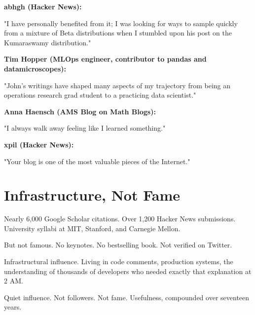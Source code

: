 \textbf{abhgh (Hacker News):}
\begin{blogquote}
"I have personally benefited from it; I was looking for ways to sample quickly from a mixture of Beta distributions when I stumbled upon his post on the Kumaraswamy distribution."
\end{blogquote}

\textbf{Tim Hopper (MLOps engineer, contributor to pandas and datamicroscopes):}
\begin{blogquote}
"John's writings have shaped many aspects of my trajectory from being an operations research grad student to a practicing data scientist."
\end{blogquote}

\textbf{Anna Haensch (AMS Blog on Math Blogs):}
\begin{blogquote}
"I always walk away feeling like I learned something."
\end{blogquote}

\textbf{xpil (Hacker News):}
\begin{blogquote}
"Your blog is one of the most valuable pieces of the Internet."
\end{blogquote}

\bigskip

\section*{Infrastructure, Not Fame}

Nearly 6,000 Google Scholar citations. Over 1,200 Hacker News submissions. University syllabi at MIT, Stanford, and Carnegie Mellon.

But not famous. No keynotes. No bestselling book. Not verified on Twitter.

Infrastructural influence. Living in code comments, production systems, the understanding of thousands of developers who needed exactly that explanation at 2 AM.

Quiet influence. Not followers. Not fame. Usefulness, compounded over seventeen years.


